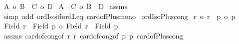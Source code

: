 \begin{isabellebody}
\ {\isachardoublequoteopen}{\isacharbar}{\kern0pt}A{\isacharbar}{\kern0pt}\ {\isacharequal}{\kern0pt}o\ {\isacharbar}{\kern0pt}B{\isacharbar}{\kern0pt}{\isachardoublequoteclose}\ \ {\isachardoublequoteopen}{\isacharbar}{\kern0pt}C{\isacharbar}{\kern0pt}\ {\isacharequal}{\kern0pt}o\ {\isacharbar}{\kern0pt}D{\isacharbar}{\kern0pt}{\isachardoublequoteclose}\isanewline
{}\ {\isachardoublequoteopen}{\isacharbar}{\kern0pt}A\ {\isacharless}{\kern0pt}{\isacharplus}{\kern0pt}{\isachargreater}{\kern0pt}\ C{\isacharbar}{\kern0pt}\ {\isacharequal}{\kern0pt}o\ {\isacharbar}{\kern0pt}B\ {\isacharless}{\kern0pt}{\isacharplus}{\kern0pt}{\isachargreater}{\kern0pt}\ D{\isacharbar}{\kern0pt}{\isachardoublequoteclose}\isanewline
%
\isadelimproof
%
\endisadelimproof
%
\isatagproof
{}\isamarkupfalse%
\ assms\ \isamarkupfalse%
\ {\isacharparenleft}{\kern0pt}simp\ add{\isacharcolon}{\kern0pt}\ ordIso{\isacharunderscore}{\kern0pt}iff{\isacharunderscore}{\kern0pt}ordLeq\ card{\isacharunderscore}{\kern0pt}of{\isacharunderscore}{\kern0pt}Plus{\isacharunderscore}{\kern0pt}mono{\isacharparenright}{\kern0pt}%
\endisatagproof
{\isafoldproof}%
%
\isadelimproof
\isanewline
%
\endisadelimproof
\isanewline
{}\isamarkupfalse%
\ ordIso{\isacharunderscore}{\kern0pt}Plus{\isacharunderscore}{\kern0pt}cong{\isacharcolon}{\kern0pt}\isanewline
{}\ {\isachardoublequoteopen}r\ {\isacharequal}{\kern0pt}o\ r{\isacharprime}{\kern0pt}{\isachardoublequoteclose}\ \ {\isachardoublequoteopen}p\ {\isacharequal}{\kern0pt}o\ p{\isacharprime}{\kern0pt}{\isachardoublequoteclose}\isanewline
{}\ {\isachardoublequoteopen}{\isacharbar}{\kern0pt}{\isacharparenleft}{\kern0pt}Field\ r{\isacharparenright}{\kern0pt}\ {\isacharless}{\kern0pt}{\isacharplus}{\kern0pt}{\isachargreater}{\kern0pt}\ {\isacharparenleft}{\kern0pt}Field\ p{\isacharparenright}{\kern0pt}{\isacharbar}{\kern0pt}\ {\isacharequal}{\kern0pt}o\ {\isacharbar}{\kern0pt}{\isacharparenleft}{\kern0pt}Field\ r{\isacharprime}{\kern0pt}{\isacharparenright}{\kern0pt}\ {\isacharless}{\kern0pt}{\isacharplus}{\kern0pt}{\isachargreater}{\kern0pt}\ {\isacharparenleft}{\kern0pt}Field\ p{\isacharprime}{\kern0pt}{\isacharparenright}{\kern0pt}{\isacharbar}{\kern0pt}{\isachardoublequoteclose}\isanewline
%
\isadelimproof
%
\endisadelimproof
%
\isatagproof
{}\isamarkupfalse%
\ assms\ card{\isacharunderscore}{\kern0pt}of{\isacharunderscore}{\kern0pt}cong{\isacharbrackleft}{\kern0pt}of\ r\ r{\isacharprime}{\kern0pt}{\isacharbrackright}{\kern0pt}\ card{\isacharunderscore}{\kern0pt}of{\isacharunderscore}{\kern0pt}cong{\isacharbrackleft}{\kern0pt}of\ p\ p{\isacharprime}{\kern0pt}{\isacharbrackright}{\kern0pt}\ card{\isacharunderscore}{\kern0pt}of{\isacharunderscore}{\kern0pt}Plus{\isacharunderscore}{\kern0pt}cong\ \isamarkupfalse%

\end{isabellebody}
